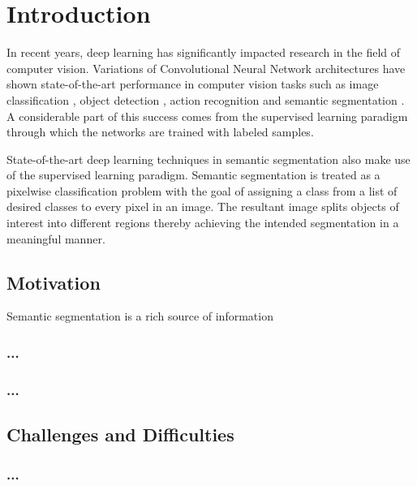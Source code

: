 
\chapter{Introduction}

In recent years, deep learning has significantly impacted research in the field of computer vision. Variations of Convolutional Neural Network architectures have shown state-of-the-art performance in computer vision tasks such as image classification \cite{DBLP:journals/corr/HeZRS15}, object detection \cite{DBLP:journals/corr/RedmonDGF15}, action recognition \cite{DBLP:journals/corr/SimonyanZ14} and semantic segmentation \cite{DBLP:journals/corr/abs-1802-02611}. A considerable part of this success comes from the supervised learning paradigm through which the networks are trained with labeled samples.

State-of-the-art deep learning techniques in semantic segmentation also make use of the supervised learning paradigm. Semantic segmentation is treated as a pixelwise classification problem with the goal of assigning a class from a list of desired classes to every pixel in an image. The resultant image splits objects of interest into different regions thereby achieving the intended segmentation in a meaningful manner.

\section{Motivation}

Semantic segmentation is a rich source of information

\subsection{...}


\subsection{...}


\section{Challenges and Difficulties}
\subsection{...}


